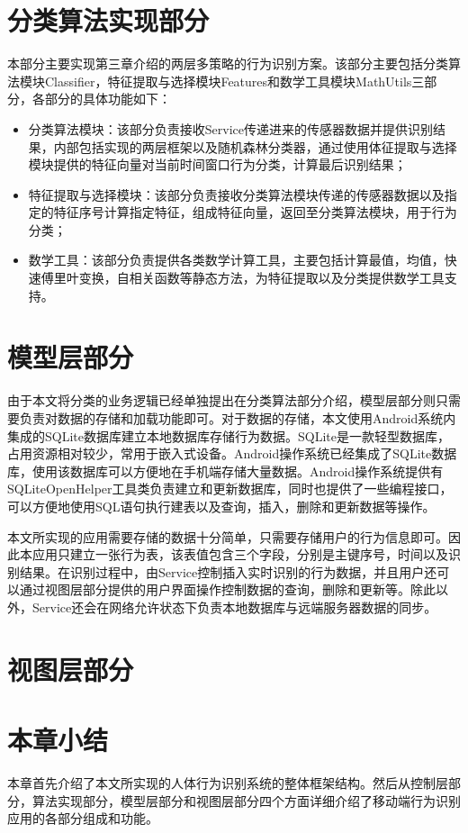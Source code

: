 \section{分类算法实现部分}
\par 本部分主要实现第三章介绍的两层多策略的行为识别方案。该部分主要包括分类算法模块Classifier，特征提取与选择模块Features和数学工具模块MathUtils三部分，各部分的具体功能如下：
\begin{itemize}
	\item 分类算法模块：该部分负责接收Service传递进来的传感器数据并提供识别结果，内部包括实现的两层框架以及随机森林分类器，通过使用体征提取与选择模块提供的特征向量对当前时间窗口行为分类，计算最后识别结果；
	\item 特征提取与选择模块：该部分负责接收分类算法模块传递的传感器数据以及指定的特征序号计算指定特征，组成特征向量，返回至分类算法模块，用于行为分类；
	\item 数学工具：该部分负责提供各类数学计算工具，主要包括计算最值，均值，快速傅里叶变换，自相关函数等静态方法，为特征提取以及分类提供数学工具支持。
\end{itemize}
\section{模型层部分}
\par 由于本文将分类的业务逻辑已经单独提出在分类算法部分介绍，模型层部分则只需要负责对数据的存储和加载功能即可。对于数据的存储，本文使用Android系统内集成的SQLite数据库建立本地数据库存储行为数据。SQLite是一款轻型数据库，占用资源相对较少，常用于嵌入式设备。Android操作系统已经集成了SQLite数据库，使用该数据库可以方便地在手机端存储大量数据。Android操作系统提供有SQLiteOpenHelper工具类负责建立和更新数据库，同时也提供了一些编程接口，可以方便地使用SQL语句执行建表以及查询，插入，删除和更新数据等操作。
\par 本文所实现的应用需要存储的数据十分简单，只需要存储用户的行为信息即可。因此本应用只建立一张行为表，该表值包含三个字段，分别是主键序号，时间以及识别结果。在识别过程中，由Service控制插入实时识别的行为数据，并且用户还可以通过视图层部分提供的用户界面操作控制数据的查询，删除和更新等。除此以外，Service还会在网络允许状态下负责本地数据库与远端服务器数据的同步。
\section{视图层部分}

\section{本章小结}
\par 本章首先介绍了本文所实现的人体行为识别系统的整体框架结构。然后从控制层部分，算法实现部分，模型层部分和视图层部分四个方面详细介绍了移动端行为识别应用的各部分组成和功能。
